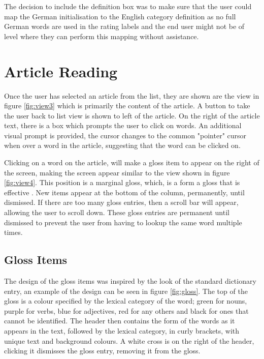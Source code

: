 The decision to include the definition box was to make sure that the user could map the German initialisation to the English category definition as no full German words are used in the rating labels and the end user might not be of level where they can perform this mapping without assistance.  

\section{Article Reading}

Once the user has selected an article from the list, they are shown are the view in figure \ref{fig:view3} which is primarily the content of the article. A button to take the user back to list view is shown to left of the article. On the right of the article text, there is a box which prompts the user to click on words. An additional visual prompt is provided, the cursor changes to the common "pointer" cursor when over a word in the article, suggesting that the word can be clicked on.




Clicking on a word on the article, will make a gloss item to appear on the right of the screen, making the screen appear similar to the view shown in figure \ref{fig:view4}. This position is a marginal gloss, which, is a form a gloss that is effective \autocite{abuseileek2008}. New items appear at the bottom of the column, permanently, until dismissed. If there are too many gloss entries, then a scroll bar will appear, allowing the user to scroll down. These gloss entries are permanent until dismissed to prevent the user from having to lookup the same word multiple times.


 

\subsection{Gloss Items}



The design of the gloss items was inspired by the look of the standard dictionary entry, an example of the design can be seen in figure \ref{fig:gloss}. The top of the gloss is a colour specified by the lexical category of the word; green for nouns, purple for verbs, blue for adjectives, red for any others and black for ones that cannot be identified. The header then contains the form of the words as it appears in the text, followed by the lexical category, in curly brackets, with unique text and background colours. A white cross is on the right of the header, clicking it dismisses the gloss entry, removing it from the gloss. 

